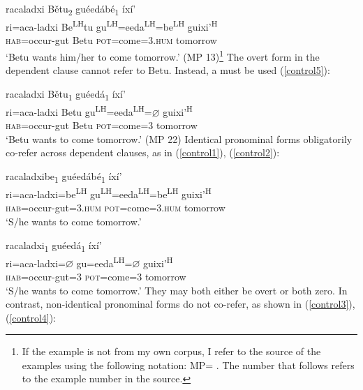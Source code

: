 \ea\label{control6}
\glll racaladxi B\v{e}tu\textsubscript{2} gu\'{e}ed\'{a}b\'{e}\textsubscript{1} \'{i}x\'{i}' \\
ri=aca-ladxi Be\textsuperscript{LH}tu gu\textsuperscript{LH}=eeda\textsuperscript{LH}=be\textsuperscript{LH}  guixi'\textsuperscript{H}  \\
\textsc{hab}=occur-gut Betu \textsc{pot}=come=\textsc{3.hum} tomorrow \\
\glt `Betu wants him/her to come tomorrow.'  \hfill{(MP 13)}\footnote{If the example is not from my own corpus, I refer to the source of the examples using the following notation: MP= \citet{marlett1996}.
The number that follows refers to the example number in the source.}
\z
The overt form in the dependent clause cannot refer to Betu. Instead, a  must be used (\ref{control5}):

\ea\label{control5}
\glll racaladxi B\v{e}tu\textsubscript{1} gu\'{e}ed\'{a}\textsubscript{1} \'{i}x\'{i}' \\
ri=aca-ladxi Betu gu\textsuperscript{LH}=eeda\textsuperscript{LH}={$\varnothing$} guixi'\textsuperscript{H}  \\
\textsc{hab}=occur-gut Betu \textsc{pot}=come=\textsc{3} tomorrow \\
\glt `Betu wants to come tomorrow.' \hfill{(MP 22)}
\z
Identical pronominal forms obligatorily co-refer across dependent clauses, as in (\ref{control1}), (\ref{control2}):

\ea\label{control1}
\glll racaladxibe\textsubscript{1} gu\'{e}ed\'{a}b\'{e}\textsubscript{1} \'{i}x\'{i}' \\
ri=aca-ladxi=be\textsuperscript{LH}  gu\textsuperscript{LH}=eeda\textsuperscript{LH}=be\textsuperscript{LH}  guixi'\textsuperscript{H}  \\
\textsc{hab}=occur-gut=\textsc{3.hum} \textsc{pot}=come=\textsc{3.hum} tomorrow \\
\glt `S/he wants to come tomorrow.'
\z

\ea\label{control2}
\glll racaladxi\textsubscript{1} gu\'{e}ed\'{a}\textsubscript{1} \'{i}x\'{i}' \\
ri=aca-ladxi={$\varnothing$} gu=eeda\textsuperscript{LH}={$\varnothing$} guixi'\textsuperscript{H}  \\
\textsc{hab}=occur-gut=\textsc{3} \textsc{pot}=come=\textsc{3} tomorrow \\
\glt `S/he wants to come tomorrow.'
\z
They may both either be overt or both zero. In contrast, non-identical pronominal forms do not co-refer, as shown in (\ref{control3}), (\ref{control4}):

